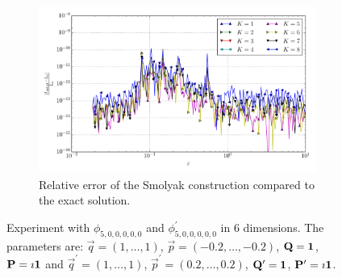 \documentclass[a4paper,10pt]{article}
\begin{document}
\begin{figure}[ht!]
\begin{subfigure}[t]{0.5\linewidth}
    \includegraphics[width=\linewidth]{./plots/tp_sg_6d_conv_eps_(5,0,0,0,0,0)_(5,0,0,0,0,0)_err_rel_nsd_gk.pdf}
    \caption{Relative error of the Smolyak construction compared to the exact solution.}
    \label{fig:tp_sg_6d_conv_eps_500000_500000_err_rel_nsd_gk}
  \end{subfigure}
  \label{fig:tp_sg_6d_conv_eps_500000_500000}
  \caption{Experiment with $\phi_{5,0,0,0,0,0}$ and $\phi_{5,0,0,0,0,0}^{\prime}$
  in 6 dimensions.
  The parameters are:
  $\vec{q} = (1, \ldots, 1)$,
  $\vec{p} = (-0.2, \ldots, -0.2)$,
  $\mathbf{Q} = \mathbf{1}$,
  $\mathbf{P} = \imath \mathbf{1}$
  and
  $\vec{q}^\prime = (1, \ldots, 1)$,
  $\vec{p}^\prime = (0.2, \ldots, 0.2)$,
  $\mathbf{Q}^\prime = \mathbf{1}$,
  $\mathbf{P}^\prime = \imath \mathbf{1}$.}
\end{figure}
\end{document}
